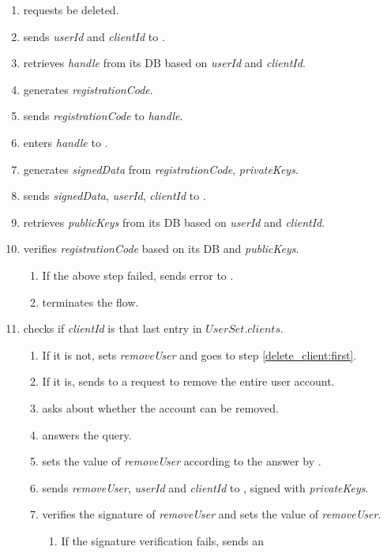 \documentclass[a4paper,10pt]{article}
\newcommand{\signedData}{\emph{signedData}}
\newcommand{\handle}{\emph{handle}}
\newcommand{\registrationCode}{\emph{registrationCode}}
\newcommand{\privateKeys}{\emph{privateKeys}}
\newcommand{\publicKeys}{\emph{publicKeys}}
\newcommand{\userId}{\emph{userId}}
\newcommand{\clientId}{\emph{clientId}}
\newcommand{\removeUser}{\emph{removeUser}}
\begin{document}
\begin{enumerate}
 \item \User{} requests \Client{} be deleted.
 \item \Client{} sends \userId{} and \clientId{} to \Server{}.
 \item \Server{} retrieves \handle{} from its DB based on \userId{} and 
\clientId{}.
 \item \Server{} generates \registrationCode{}.
 \item \Server{} sends \registrationCode{} to \handle{}.
 \item \User{} enters \handle{} to \Client{}.
 \item \Client{} generates \signedData{} from \registrationCode{}, 
\privateKeys{}.
 \item \Client{} sends \signedData{}, \userId{}, \clientId{} to \Server{}.
 \item \Server{} retrieves \publicKeys{} from its DB based on \userId{} and 
\clientId{}.
 \item \Server{} verifies \registrationCode{} based on its DB and \publicKeys{}.
 \begin{enumerate}
  \item If the above step failed, \Server{} sends error to \Client{}.
  \item \Client{} terminates the flow.
 \end{enumerate}
 \item \Server{} checks if \clientId{} is that last entry in $UserSet.clients$.
 \begin{enumerate}
  \item If it is not, \Server{} sets \removeUser{} and goes to 
step \ref{delete_client:first}.
  \item If it is, \Server{} sends to \Client{} a request to remove the entire 
user account.
  \item \Client{} asks \User{} about whether the account can be removed.
  \item \User{} answers the query.
  \item \Client{} sets the value of \removeUser{} according to the answer by 
\User{}.
  \item{} \Client{} sends \removeUser{}, \userId{} and \clientId{} to 
\Server{}, signed with \privateKeys{}.
  \item{} \Server{} verifies the signature of \removeUser{} and sets the value 
of \removeUser{}.
  \begin{enumerate}
   \item If the signature verification fails, \Server{} sends \Client{} an 

\end{enumerate}
\end{enumerate}
\end{enumerate}
\end{document}
